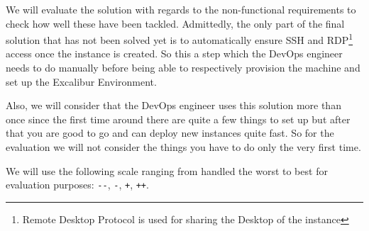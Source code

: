 



We will evaluate the solution with regards to the non-functional
requirements to check how well these have been tackled. Admittedly,
the only part of the final solution that has not been solved yet is to
automatically ensure SSH and RDP\footnote{Remote Desktop Protocol is
used for sharing the Desktop of the instance} access once the instance
is created.  So this a step which the DevOps engineer needs to do
manually before being able to respectively provision the machine and
set up the Excalibur Environment.

Also, we will consider that the DevOps engineer uses this solution
more than once since the first time around there are quite a few
things to set up but after that you are good to go and can deploy new
instances quite fast. So for the evaluation we will not consider the
things you have to do only the very first time.

We will use the following scale ranging from handled the worst to best
for evaluation purposes: \verb|--|, \verb|-|, \verb|+|, \verb|++|.


